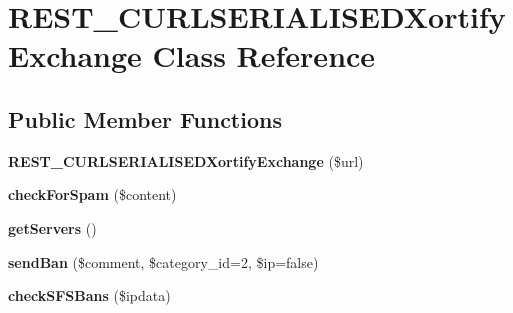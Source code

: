 \hypertarget{class_r_e_s_t___c_u_r_l_s_e_r_i_a_l_i_s_e_d_xortify_exchange}{\section{R\-E\-S\-T\-\_\-\-C\-U\-R\-L\-S\-E\-R\-I\-A\-L\-I\-S\-E\-D\-Xortify\-Exchange Class Reference}
\label{class_r_e_s_t___c_u_r_l_s_e_r_i_a_l_i_s_e_d_xortify_exchange}
}
\subsection*{Public Member Functions}
\begin{DoxyCompactItemize}
\item 
\hypertarget{class_r_e_s_t___c_u_r_l_s_e_r_i_a_l_i_s_e_d_xortify_exchange_a7fa5fed254db9c1ef2a324cd17e31b12}{{\bfseries R\-E\-S\-T\-\_\-\-C\-U\-R\-L\-S\-E\-R\-I\-A\-L\-I\-S\-E\-D\-Xortify\-Exchange} (\$url)}\label{class_r_e_s_t___c_u_r_l_s_e_r_i_a_l_i_s_e_d_xortify_exchange_a7fa5fed254db9c1ef2a324cd17e31b12}

\item 
\hypertarget{class_r_e_s_t___c_u_r_l_s_e_r_i_a_l_i_s_e_d_xortify_exchange_a7a4f53c3841dc7806455261af557d514}{{\bfseries check\-For\-Spam} (\$content)}\label{class_r_e_s_t___c_u_r_l_s_e_r_i_a_l_i_s_e_d_xortify_exchange_a7a4f53c3841dc7806455261af557d514}

\item 
\hypertarget{class_r_e_s_t___c_u_r_l_s_e_r_i_a_l_i_s_e_d_xortify_exchange_a882f365bc81e207dc2123ef707735e82}{{\bfseries get\-Servers} ()}\label{class_r_e_s_t___c_u_r_l_s_e_r_i_a_l_i_s_e_d_xortify_exchange_a882f365bc81e207dc2123ef707735e82}

\item 
\hypertarget{class_r_e_s_t___c_u_r_l_s_e_r_i_a_l_i_s_e_d_xortify_exchange_a0293acfa4afe0cb5b2816352a35d8ca7}{{\bfseries send\-Ban} (\$comment, \$category\-\_\-id=2, \$ip=false)}\label{class_r_e_s_t___c_u_r_l_s_e_r_i_a_l_i_s_e_d_xortify_exchange_a0293acfa4afe0cb5b2816352a35d8ca7}

\item 
\hypertarget{class_r_e_s_t___c_u_r_l_s_e_r_i_a_l_i_s_e_d_xortify_exchange_a985a563a84e3e5c54694fcce192bda53}{{\bfseries check\-S\-F\-S\-Bans} (\$ipdata)}\label{class_r_e_s_t___c_u_r_l_s_e_r_i_a_l_i_s_e_d_xortify_exchange_a985a563a84e3e5c54694fcce192bda53}


\end{DoxyCompactItemize}
